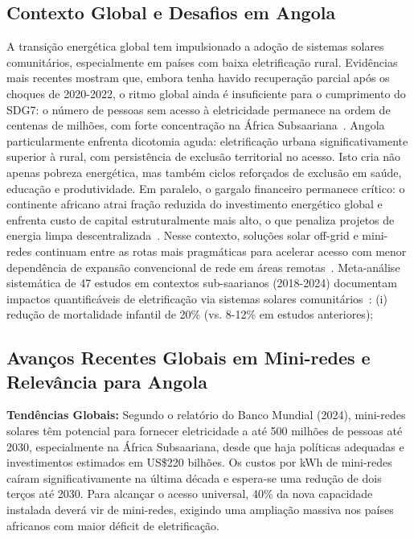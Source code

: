 \documentclass[12pt, a4paper]{article}
\begin{document}
\subsection{Contexto Global e Desafios em Angola}
A transição energética global tem impulsionado a adoção de sistemas solares comunitários, especialmente em países com baixa eletrificação rural. Evidências mais recentes mostram que, embora tenha havido recuperação parcial após os choques de 2020-2022, o ritmo global ainda é insuficiente para o cumprimento do SDG7: o número de pessoas sem acesso à eletricidade permanece na ordem de centenas de milhões, com forte concentração na África Subsaariana~\citep{IEA_Access2023,UN_SDG7_2025,TrackingSDG7_2025}. Angola particularmente enfrenta dicotomia aguda: eletrificação urbana significativamente superior à rural, com persistência de exclusão territorial no acesso.
Isto cria não apenas pobreza energética, mas também ciclos reforçados de exclusão em saúde, educação e produtividade. Em paralelo, o gargalo financeiro permanece crítico: o continente africano atrai fração reduzida do investimento energético global e enfrenta custo de capital estruturalmente mais alto, o que penaliza projetos de energia limpa descentralizada~\citep{IEA_FinancingAfrica2023}. Nesse contexto, soluções solar off-grid e mini-redes continuam entre as rotas mais pragmáticas para acelerar acesso com menor dependência de expansão convencional de rede em áreas remotas~\citep{Olaniyi2025,WorldBank2024}.
Meta-análise sistemática de 47 estudos em contextos sub-saarianos (2018-2024) documentam impactos quantificáveis de eletrificação via sistemas solares comunitários~\citep{Byaro2024}:
(i) redução de mortalidade infantil de 20\% (vs. 8-12\% em estudos anteriores);

\subsection{Avanços Recentes Globais em Mini-redes e Relevância para Angola}
\textbf{Tendências Globais:} Segundo o relatório do Banco Mundial (2024), mini-redes solares têm potencial para fornecer eletricidade a até 500 milhões de pessoas até 2030, especialmente na África Subsaariana, desde que haja políticas adequadas e investimentos estimados em US\$220 bilhões. Os custos por kWh de mini-redes caíram significativamente na última década e espera-se uma redução de dois terços até 2030. Para alcançar o acesso universal, 40\% da nova capacidade instalada deverá vir de mini-redes, exigindo uma ampliação massiva nos países africanos com maior déficit de eletrificação.
\end{document}
